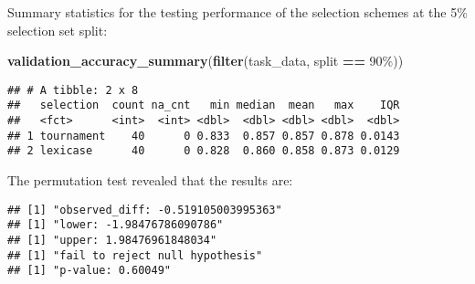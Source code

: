 \documentclass[
]{book}
\newenvironment{Shaded}{\begin{snugshade}}{\end{snugshade}}
\newcommand{\AttributeTok}[1]{\textcolor[rgb]{0.13,0.29,0.53}{#1}}
\newcommand{\DecValTok}[1]{\textcolor[rgb]{0.00,0.00,0.81}{#1}}
\newcommand{\FunctionTok}[1]{\textcolor[rgb]{0.13,0.29,0.53}{\textbf{#1}}}
\newcommand{\NormalTok}[1]{#1}
\newcommand{\OtherTok}[1]{\textcolor[rgb]{0.56,0.35,0.01}{#1}}
\newcommand{\SpecialCharTok}[1]{\textcolor[rgb]{0.81,0.36,0.00}{\textbf{#1}}}
\newcommand{\StringTok}[1]{\textcolor[rgb]{0.31,0.60,0.02}{#1}}
\begin{document}
Summary statistics for the testing performance of the selection schemes at the 5\% selection set split:

\begin{Shaded}
\begin{Highlighting}[]
\FunctionTok{validation\_accuracy\_summary}\NormalTok{(}\FunctionTok{filter}\NormalTok{(task\_data, split }\SpecialCharTok{==} \StringTok{\textquotesingle{}90\%\textquotesingle{}}\NormalTok{))}
\end{Highlighting}
\end{Shaded}

\begin{verbatim}
## # A tibble: 2 x 8
##   selection  count na_cnt   min median  mean   max    IQR
##   <fct>      <int>  <int> <dbl>  <dbl> <dbl> <dbl>  <dbl>
## 1 tournament    40      0 0.833  0.857 0.857 0.878 0.0143
## 2 lexicase      40      0 0.828  0.860 0.858 0.873 0.0129
\end{verbatim}

The permutation test revealed that the results are:

\begin{Shaded}
\end{Shaded}

\begin{verbatim}
## [1] "observed_diff: -0.519105003995363"
## [1] "lower: -1.98476786090786"
## [1] "upper: 1.98476961848034"
## [1] "fail to reject null hypothesis"
## [1] "p-value: 0.60049"
\end{verbatim}
\end{document}
